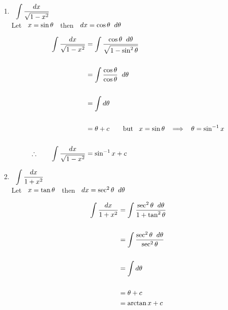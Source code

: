 \documentclass[11pt,a4paper]{article}
\begin{document}
\begin{enumerate}
\item $\hspace{0.2cm}\displaystyle{\int \dfrac{dx}{\sqrt{1 - x^2}}}$\\

Let $\hspace{0.2cm} x = \sin \theta\hspace{0.2cm}$ then $\hspace{0.2cm} dx = \cos \theta \hspace{0.2cm}d\theta$


\begin{align*}
\int \dfrac{dx}{\sqrt{1 - x^2}} & = \int \dfrac{\cos \theta\hspace{0.2cm}d \theta}{\sqrt{1 - \sin^2\theta}}\\\\
& = \int \dfrac{\cos \theta}{\cos \theta}\hspace{0.2cm}d\theta\\\\
& = \int d\theta\\\\
& = \theta + c \hspace{0.7cm}\text{but}\hspace{0.3cm} x = \sin \theta \hspace{0.2cm}\implies\hspace{0.2cm} \theta = \sin^{-1}x\\\\
\therefore\hspace{0.7cm} \int \dfrac{dx}{\sqrt{1 - x^2}} & = \sin^{-1} x + c\\
\end{align*}




\item $\hspace{0.2cm}\displaystyle{\int \dfrac{dx}{1 + x^2}}$\\

Let $\hspace{0.2cm} x = \tan \theta\hspace{0.2cm}$ then $\hspace{0.2cm} dx = \sec^2\theta \hspace{0.2cm}d\theta$

\begin{align*}
\int \dfrac{dx}{1 + x^2} & = \int \frac{\sec^2\theta \hspace{0.2cm}d\theta}{1 + \tan^2\theta}\\\\
& = \int \frac{\sec^2\theta \hspace{0.2cm}d\theta}{\sec^2\theta}\\\\
& = \int d\theta\\\\
& = \theta + c\\
& = \arctan x + c\\\\
\end{align*}
\end{enumerate}
\end{document}
